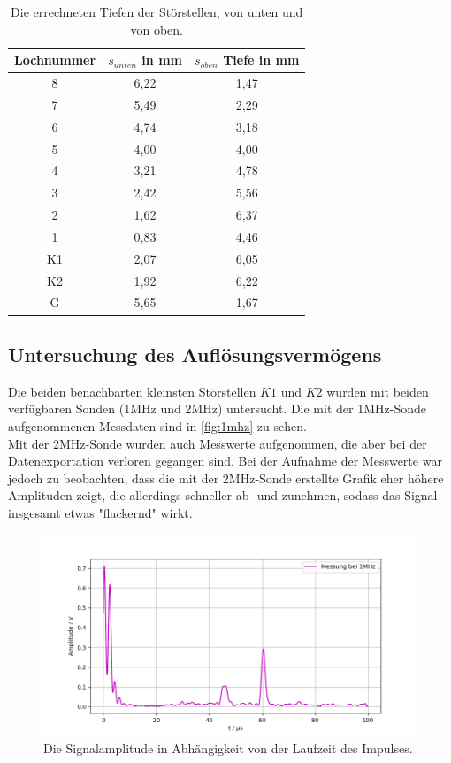\begin{table}[h]
    \centering
    \caption{Die errechneten Tiefen der Störstellen, von unten und von oben.}
    \begin{tabular}{ccc}
      \toprule
      {Lochnummer} & 
      {$s_{unten}$ in mm} &
      {$s_{oben}$ Tiefe in mm} \\
      \midrule
      8  &  6,22  & 1,47  \\
      7  &  5,49  & 2,29  \\
      6  &  4,74  & 3,18  \\
      5  &  4,00  & 4,00  \\
      4  &  3,21  & 4,78  \\
      3  &  2,42  & 5,56  \\
      2  &  1,62  & 6,37  \\
      1  &  0,83  & 4,46  \\
      K1 &  2,07  & 6,05  \\
      K2 &  1,92  & 6,22  \\   
      G  &  5,65  & 1,67  \\
      \bottomrule
    \end{tabular}
 \label{tab:tiefe}
\end{table}
\noindent


\subsection{Untersuchung des Auflösungsvermögens}
Die beiden benachbarten kleinsten Störstellen $K1$ und $K2$ wurden mit beiden verfügbaren
Sonden (1MHz und 2MHz) untersucht. Die mit der 1MHz-Sonde aufgenommenen Messdaten sind in \autoref{fig:1mhz} zu sehen.\\
Mit der 2MHz-Sonde wurden auch Messwerte aufgenommen, die aber bei der Datenexportation verloren gegangen sind. 
Bei der Aufnahme der Messwerte war jedoch zu beobachten, dass die mit der 2MHz-Sonde erstellte Grafik eher höhere 
Amplituden zeigt, die allerdings schneller ab- und zunehmen, sodass das Signal insgesamt etwas "flackernd" wirkt.
\begin{figure}[H]
  \centering
  \includegraphics[width = \textwidth]{content/1mhz_aufl_plot.png}
  \caption{Die Signalamplitude in Abhängigkeit von der Laufzeit des Impulses.}
  \label{fig:1mhz}
\end{figure}


